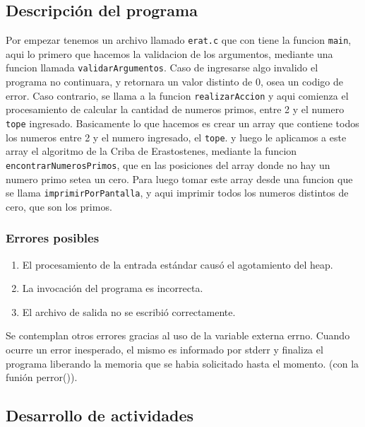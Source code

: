 \documentclass[a4paper,10pt]{article}
\begin{document}
\subsection {{\normalsize Descripción del programa}}

Por empezar tenemos un archivo llamado \texttt{erat.c} que con tiene la funcion
\texttt{main}, aqui lo primero que hacemos la validacion de los argumentos, mediante 
una funcion llamada \texttt{validarArgumentos}. Caso de ingresarse algo invalido 
el programa no continuara, y retornara un valor distinto de 0, osea un codigo de error. Caso contrario, 
se llama a la funcion \texttt{realizarAccion} y aqui comienza el procesamiento de calcular 
la cantidad de numeros primos, entre 2 y el numero \texttt{tope} ingresado. Basicamente lo que hacemos es 
crear un array que contiene todos los numeros entre 2 y el numero ingresado, el \texttt{tope}. 
y luego le aplicamos a este array el algoritmo de la Criba de Erastostenes, mediante la funcion \texttt{encontrarNumerosPrimos},
que en las posiciones del array donde no hay un numero primo setea un cero.
Para luego tomar este array desde una funcion que se llama \texttt{imprimirPorPantalla}, y aqui imprimir todos los numeros distintos
de cero, que son los primos.

\subsubsection {{\normalsize Errores posibles}}

\begin{enumerate}
\item El procesamiento de la entrada estándar causó el agotamiento del heap.
\item La invocación del programa es incorrecta.
\item El archivo de salida no se escribió correctamente.
\end{enumerate}

Se contemplan otros errores gracias al uso de la variable externa errno. 
Cuando ocurre un error inesperado, el mismo es informado por stderr y finaliza el programa
liberando la memoria que se habia solicitado hasta el momento.
(con la funión perror()).

\subsection{{\normalsize Desarrollo de actividades}}
\end{document}
